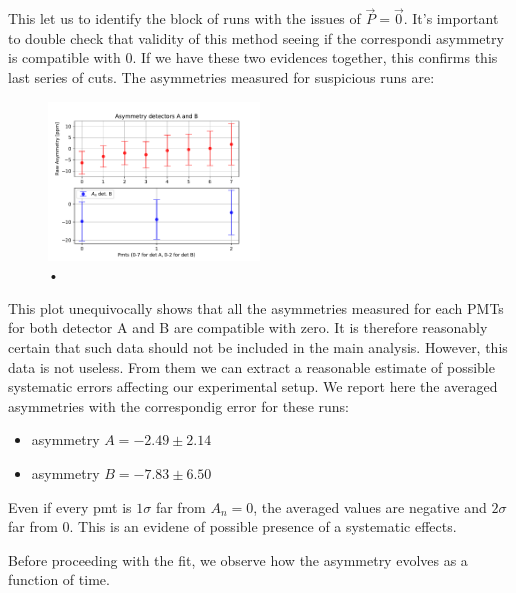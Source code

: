 This let us to identify the block of runs with the issues of $\vec{P} = \vec{0}$. It's important to double check that validity of this method seeing if the correspondi asymmetry is compatible with $0$. If we have these two evidences together, this confirms this last series of cuts. The asymmetries measured for suspicious runs are:

\begin{figure}[hbtp]
\centering
\includegraphics[width= 0.5\textwidth]{Analysis/Dataselection/Nopolarity.pdf}
\caption{•}
\end{figure}

This plot unequivocally shows that all the asymmetries measured for each PMTs for both detector A and B are compatible with zero. It is therefore reasonably certain that such data should not be included in the main analysis. However, this data is not useless. From them we can extract a reasonable estimate of possible systematic errors affecting our experimental setup. We report here the averaged asymmetries with the correspondig error for these runs:
\begin{itemize}
\item asymmetry $A =  -2.49 \pm 2.14$
\item asymmetry $B =  -7.83 \pm 6.50$
\end{itemize}

Even if every pmt is $1\sigma$ far from $A_{n} = 0$, the averaged values are negative and $2\sigma$ far from 0. This is an evidene of possible presence of a systematic effects.

Before proceeding with the fit, we observe how the asymmetry evolves as a function of time.

